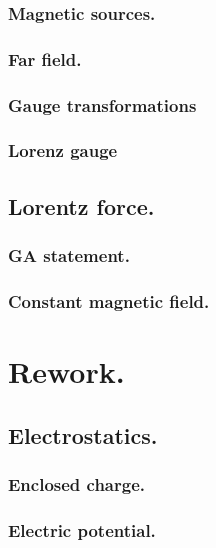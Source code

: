          \subsection{Magnetic sources.}
            
         \subsection{Far field.}
            
         \subsection{Gauge transformations}
            
         \subsection{Lorenz gauge}
            
      \section{Lorentz force.}
         \subsection{GA statement.}
            
         \subsection{Constant magnetic field.}
            
      \chapter{Rework.}
      \section{Electrostatics.}
         
         \subsection{Enclosed charge.}
            
         \subsection{Electric potential.}
            
